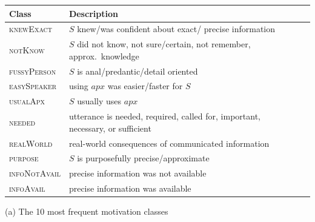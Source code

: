 \documentclass{article}
\newcommand{\xvar}[1]{\textsc{#1}}
\begin{document}
\begin{minipage}{20.0cm}

\begin{minipage}{9.8cm}

\renewcommand*{\arraystretch}{1.05}
\begin{tabular}{|l|p{6cm}|c|}
 \hline
Class & Description  \\
 \hline
 \hline
\xvar{knewExact} &  $S$ knew/was confident about exact/ precise information  \\
 \hline
\xvar{notKnow} & $S$ did not know, not sure/certain, not remember,  approx.~knowledge \\
 \hline
\xvar{fussyPerson} & $S$ is anal/predantic/detail oriented \\
 \hline
\xvar{easySpeaker} & using $apx$ was easier/faster for $S$ \\
 \hline
\xvar{usualApx} & $S$ usually uses $apx$  \\
 \hline
\xvar{needed}  & utterance is needed, required, called for, important, necessary, or sufficient \\
 \hline
\xvar{realWorld} & real-world consequences of communicated information \\
 \hline
\xvar{purpose} & $S$ is purposefully precise/approximate \\
 \hline
\xvar{infoNotAvail} & precise information was not available  \\
 \hline
\xvar{infoAvail} & precise information was available  \\
 \hline
\end{tabular}

\vspace{.2cm}



\hspace{.8cm}(a) The 10 most frequent motivation classes


\end{minipage}
\begin{minipage}{10.2cm}

\renewcommand*{\arraystretch}{1.45}


\end{minipage}
\end{minipage}
\end{document}
